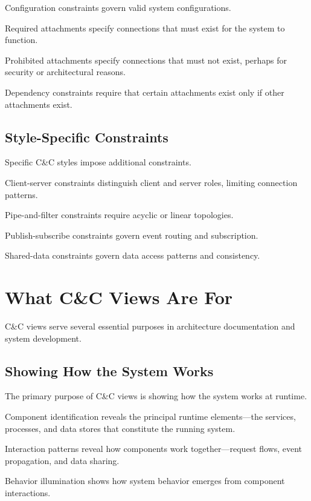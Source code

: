 \documentclass[11pt]{article}
\begin{document}
Configuration constraints govern valid system configurations.

Required attachments specify connections that must exist for the system to function.

Prohibited attachments specify connections that must not exist, perhaps for security or architectural reasons.

Dependency constraints require that certain attachments exist only if other attachments exist.

\subsection{Style-Specific Constraints}

Specific C\&C styles impose additional constraints.

Client-server constraints distinguish client and server roles, limiting connection patterns.

Pipe-and-filter constraints require acyclic or linear topologies.

Publish-subscribe constraints govern event routing and subscription.

Shared-data constraints govern data access patterns and consistency.

\section{What C\&C Views Are For}

C\&C views serve several essential purposes in architecture documentation and system development.

\subsection{Showing How the System Works}

The primary purpose of C\&C views is showing how the system works at runtime.

Component identification reveals the principal runtime elements---the services, processes, and data stores that constitute the running system.

Interaction patterns reveal how components work together---request flows, event propagation, and data sharing.

Behavior illumination shows how system behavior emerges from component interactions.
\end{document}
